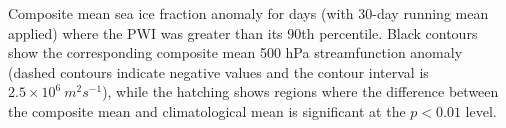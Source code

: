 \label{fig:sic_composite}
Composite mean sea ice fraction anomaly for days (with 30-day running mean applied) where the PWI was greater than its 90th percentile. Black contours show the corresponding composite mean 500 hPa streamfunction anomaly (dashed contours indicate negative values and the contour interval is $2.5 \times 10^6 \: m^2 s^{-1}$), while the hatching shows regions where the difference between the composite mean and climatological mean is significant at the $p < 0.01$ level.